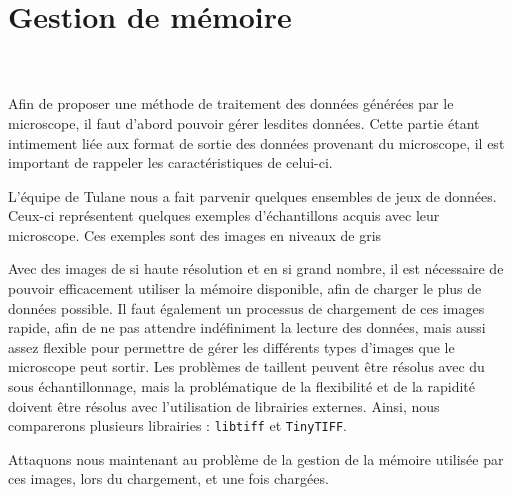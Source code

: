 {	\section{Gestion de mémoire}
	{
		\\

		\\

		Afin de proposer une méthode de traitement des données générées par le microscope, il faut d'abord pouvoir gérer lesdites données. Cette partie étant intimement liée aux format de sortie des données provenant du microscope, il est important de rappeler les caractéristiques de celui-ci.\par

		L'équipe de Tulane nous a fait parvenir quelques ensembles de jeux de données. Ceux-ci représentent quelques exemples d'échantillons acquis avec leur microscope. Ces exemples sont des images en niveaux de gris \par

		Avec des images de si haute résolution et en si grand nombre, il est nécessaire de pouvoir efficacement utiliser la mémoire disponible, afin de charger le plus de données possible. Il faut également un processus de chargement de ces images rapide, afin de ne pas attendre indéfiniment la lecture des données, mais aussi assez flexible pour permettre de gérer les différents types d'images que le microscope peut sortir. Les problèmes de taillent peuvent être résolus avec du sous échantillonnage, mais la problématique de la flexibilité et de la rapidité doivent être résolus avec l'utilisation de librairies externes. Ainsi, nous comparerons plusieurs librairies : \texttt{libtiff} et \texttt{TinyTIFF}.\par

		\par

		Attaquons nous maintenant au problème de la gestion de la mémoire utilisée par ces images, lors du chargement, et une fois chargées.

}}
